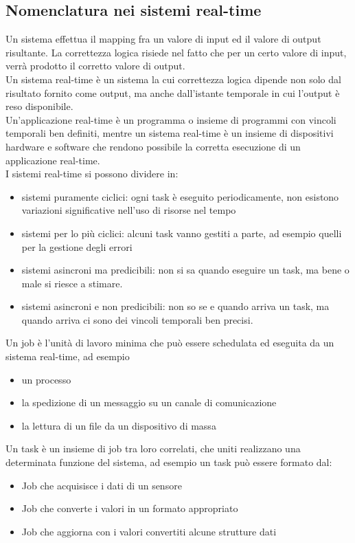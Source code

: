 \documentclass[12pt, oneside]{extbook}
\begin{document}
\subsection{Nomenclatura nei sistemi real-time}
Un sistema effettua il mapping fra un valore di input ed il valore di output risultante. La correttezza logica risiede nel fatto che per un certo valore di input, verrà prodotto il corretto valore di output.\\ Un sistema real-time è un sistema la cui correttezza logica dipende non solo dal risultato fornito come output, ma anche dall'istante temporale in cui l'output è reso disponibile.\\ Un'applicazione real-time è un programma o insieme di programmi con vincoli temporali ben definiti, mentre un sistema real-time è un insieme di dispositivi hardware e software che rendono possibile la corretta esecuzione di un applicazione real-time.\\ I sistemi real-time si possono dividere in:
\begin{itemize}
\item sistemi puramente ciclici: ogni task è eseguito periodicamente, non esistono variazioni significative nell'uso di risorse nel tempo
\item sistemi per lo più ciclici: alcuni task vanno gestiti a parte, ad esempio quelli per la gestione degli errori
\item sistemi asincroni ma predicibili: non si sa quando eseguire un task, ma bene o male si riesce a stimare.
\item sistemi asincroni e non predicibili: non so se e quando arriva un task, ma quando arriva ci sono dei vincoli temporali ben precisi.
\end{itemize}
Un job è l'unità di lavoro minima che può essere schedulata ed eseguita da un sistema real-time, ad esempio 
\begin{itemize}
\item un processo
\item la spedizione di un messaggio su un canale di comunicazione
\item la lettura di un file da un dispositivo di massa 
\end{itemize}
Un task è un insieme di job tra loro correlati, che uniti realizzano una determinata funzione del sistema, ad esempio un task può essere formato dal:
\begin{itemize}
\item Job che acquisisce i dati di un sensore
\item Job che converte i valori in un formato appropriato
\item Job che aggiorna con i valori convertiti alcune strutture dati
\end{itemize}
\end{document}
